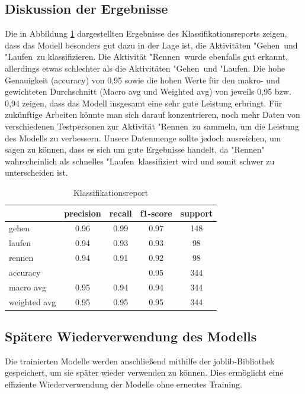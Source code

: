 \subsection{Diskussion der Ergebnisse}
Die in Abbildung \ref{tab:klassifikationsreport} dargestellten Ergebnisse des Klassifikationsreports zeigen, dass das Modell besonders gut dazu in der Lage ist, die Aktivitäten "Gehen\dq\, und "Laufen\dq\, zu klassifizieren. Die Aktivität "Rennen\dq\, wurde ebenfalls gut erkannt, allerdings etwas schlechter als die Aktivitäten "Gehen\dq\, und "Laufen\dq. Die hohe Genauigkeit (accuracy) von 0,95 sowie die hohen Werte für den makro- und gewichteten Durchschnitt (Macro avg und Weighted avg) von jeweils 0,95 bzw. 0,94 zeigen, dass das Modell insgesamt eine sehr gute Leistung erbringt. Für zukünftige Arbeiten könnte man sich darauf konzentrieren, noch mehr Daten von verschiedenen Testpersonen zur Aktivität "Rennen\dq\, zu sammeln, um die Leistung des Modells zu verbessern. Unsere Datenmenge sollte jedoch ausreichen, um sagen zu können, dass es sich um gute Ergebnisse handelt, da "Rennen" wahrscheinlich als schnelles "Laufen\dq\, klassifiziert wird und somit schwer zu unterscheiden ist. 

\bgroup
\def\arraystretch{1.5}
	\begin{table}[h]
		\centering
		\begin{tabular}{|l|c|c|c|c|}
			\hline
			& precision & recall & f1-score & support \\
			\hline
			gehen & 0.96 & 0.99 & 0.97 & 148 \\
			\hline
			laufen & 0.94 & 0.93 & 0.93 & 98 \\
			\hline
			rennen & 0.94 & 0.91 & 0.92 & 98 \\
			\hline
			accuracy & & & 0.95 & 344 \\
			\hline
			macro avg & 0.95 & 0.94 & 0.94 & 344 \\
			\hline
			weighted avg & 0.95 & 0.95 & 0.95 & 344 \\
			\hline
		\end{tabular}
		\caption{Klassifikationsreport}
		\label{tab:klassifikationsreport}
	\end{table}
\egroup

\subsection{Spätere Wiederverwendung des Modells}
Die trainierten Modelle werden anschließend mithilfe der joblib-Bibliothek gespeichert, um sie später wieder verwenden zu können. Dies ermöglicht eine effiziente Wiederverwendung der Modelle ohne erneutes Training. 

